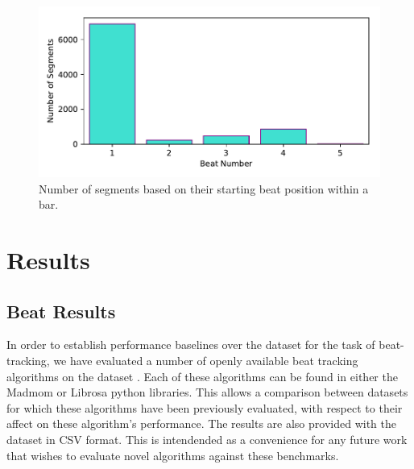 \documentclass{article}
\begin{document}
\begin{figure}
    \centerline{\includegraphics[width=\columnwidth]{figs/Downbeat_Segment_Alignment.pdf}}
    \caption{Number of segments based on their starting beat position within a bar.}
    \label{fig:downbeat_segment}
\end{figure}

\section{Results}\label{sec:results}

\subsection{Beat Results}

In order to establish performance baselines over the dataset for the task of beat-tracking, we have evaluated a number of openly available beat
tracking algorithms on the dataset \cite{Ellis2007, Krebs2015, Korzeniowski2014, Bock2011}. Each of these algorithms can be found in either the
Madmom \cite{Bock2016b} or Librosa \cite{Mcfee2015a} python libraries. This allows a comparison between datasets for which these algorithms have been previously evaluated,
with respect to their affect on these algorithm's performance. The results are also provided with the dataset in CSV format. This is intendended
as a convenience for any future work that wishes to evaluate novel algorithms against these benchmarks.
\end{document}
